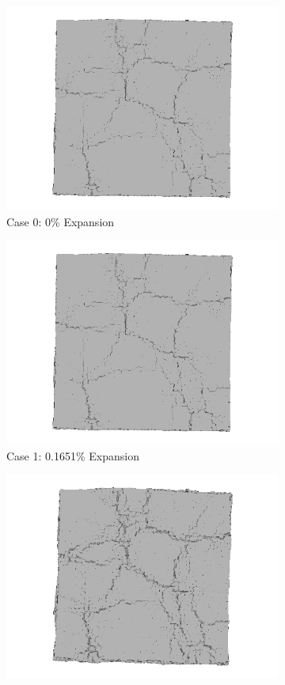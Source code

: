 \begin{figure}[!h]
\centering

    \begin{subfigure}{.5\textwidth}
      \centering
      \includegraphics[width=.8\linewidth]{Files/exp_3D/ASR/A30P25_1_3ds.png}
    \caption{Case 0: 0\% Expansion}
    \end{subfigure}%
    \begin{subfigure}{.5\textwidth}
      \centering
      \includegraphics[width=.8\linewidth]{Files/exp_3D/ASR/A30P25_1_3ds.png}
    \caption{Case 1: 0.1651\% Expansion}
    \end{subfigure}
    \begin{subfigure}{.5\textwidth}
      \centering
      \includegraphics[width=.8\linewidth]{Files/exp_3D/ASR/A30P25_2_3ds.png}

\end{subfigure}
\end{figure}
